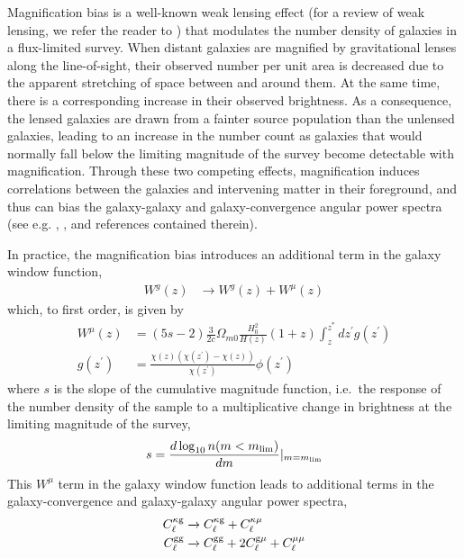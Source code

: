 Magnification bias is a well-known weak lensing effect (for a review of weak lensing, we refer the reader to \citealt{BartelmannSchneider01}) that modulates the number density of galaxies in a flux-limited survey. When distant galaxies are magnified by gravitational lenses along the line-of-sight, their observed number per unit area is decreased due to the apparent stretching of space between and around them. At the same time, there is a corresponding increase in their observed brightness. As a consequence, the lensed galaxies are drawn from a fainter source population than the unlensed galaxies, leading to an increase in the number count as galaxies that would normally fall below the limiting magnitude of the survey become detectable with magnification. Through these two competing effects, magnification induces correlations between the galaxies and intervening matter in their foreground, and thus can bias the galaxy-galaxy and galaxy-convergence angular power spectra (see e.g. \citealt{Loverde++08}, \citealt{Ziour++08}, and references contained therein).

In practice, the magnification bias introduces an additional term in the galaxy window function,
\begin{align}
    W^{g}(z)  &\xrightarrow{ } W^{g}(z) + W^{\mu}(z)
\end{align}
which, to first order, is given by
\begin{align}
    W^{\mu}(z) &= (5s-2)\frac{3}{2c} \Omega_{m0} \frac{H_0^2}{H(z)} (1+z) \int_z^{z^{*}} dz^{\prime}g(z^{\prime}) \\
    g(z^{\prime}) &= \frac{\chi(z)(\chi(z^{\prime})-\chi(z))}{\chi(z^{\prime})} \phi(z^{\prime})
\end{align}
%
where $s$ is the slope of the cumulative magnitude function, i.e.\ the response of the number density of the sample to a multiplicative change in brightness at the limiting magnitude of the survey,
\begin{align}
s = \frac{d\log_{10}n(m<m_{\rm lim})}{dm}|_{m=m_{\rm lim}}
\end{align}
This $W^{\mu}$ term in the galaxy window function leads to additional terms in the galaxy-convergence and galaxy-galaxy angular power spectra,
\begin{align}
    C_{\ell}^{\rm \kappa g} &\xrightarrow{} C_{\ell}^{\rm \kappa g} + C_{\ell}^{\kappa \mu} \label{eq:mag-bias-corrections1} \\
    C_{\ell}^{\rm gg} &\xrightarrow{} C_{\ell}^{\rm gg} + 2 C_{\ell}^{\rm g\mu} + C_{\ell}^{\mu\mu} \label{eq:mag-bias-corrections2}
\end{align}

